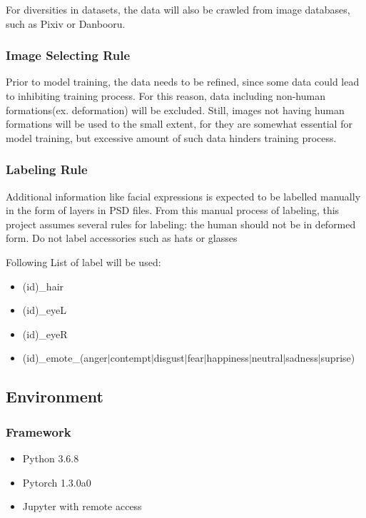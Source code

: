 \documentclass{article}
\begin{document}
For diversities in datasets, the data will also be crawled from image databases, such as Pixiv or Danbooru.

\subsubsection{Image Selecting Rule}

Prior to model training, the data needs to be refined, since some data could lead to inhibiting training process. For this reason, data including non-human formations(ex. deformation) will be excluded. Still, images not having human formations will be used to the small extent, for they are somewhat essential for model training, but excessive amount of such data hinders training process.

\subsubsection{Labeling Rule}
Additional information like facial expressions is expected to be labelled manually in the form of layers in PSD files. From this manual process of labeling, this project assumes several rules for labeling:
    the human should not be in deformed form.
    Do not label accessories such as hats or glasses \newline


Following List of label will be used:
\begin{itemize}
\item (id)\_hair
\item (id)\_eyeL
\item (id)\_eyeR
\item (id)\_emote\_(anger$|$contempt$|$disgust$|$fear\newline$|$happiness$|$neutral$|$sadness$|$suprise)
\end{itemize}

\subsection{Environment}

\subsubsection{Framework}

\begin{itemize}
\item Python 3.6.8
\item Pytorch 1.3.0a0
\item Jupyter with remote access
\end{itemize}
\end{document}
